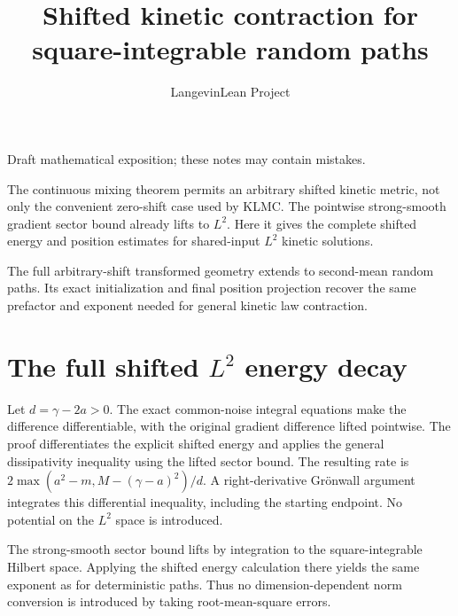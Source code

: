 \documentclass[11pt,a4paper]{article}
\title{\texorpdfstring{Shifted kinetic contraction for square-integrable random paths}{Shifted kinetic contraction for square-integrable random paths}}
\author{LangevinLean Project}
\date{}
\begin{document}
\maketitle
Draft mathematical exposition; these notes may contain mistakes.


The continuous mixing theorem permits an arbitrary shifted kinetic metric, not only the convenient zero-shift case used by KLMC. The pointwise strong-smooth gradient sector bound already lifts to \(L^{2}\). Here it gives the complete shifted energy and position estimates for shared-input \(L^{2}\) kinetic solutions.



The full arbitrary-shift transformed geometry extends to second-mean random paths. Its exact initialization and final position projection recover the same prefactor and exponent needed for general kinetic law contraction.


\section{\texorpdfstring{The full shifted \(L^{2}\) energy decay}{The full shifted L² energy decay}}


Let \(d=\gamma-2a>0\). The exact common-noise integral equations make the difference differentiable, with the original gradient difference lifted pointwise. The proof differentiates the explicit shifted energy and applies the general dissipativity inequality using the lifted sector bound. The resulting rate is \(2\max(a^2-m,M-(\gamma-a)^2)/d\). A right-derivative Grönwall argument integrates this differential inequality, including the starting endpoint. No potential on the \(L^{2}\) space is introduced.



The strong-smooth sector bound lifts by integration to the square-integrable Hilbert space. Applying the shifted energy calculation there yields the same exponent as for deterministic paths. Thus no dimension-dependent norm conversion is introduced by taking root-mean-square errors.
\end{document}
